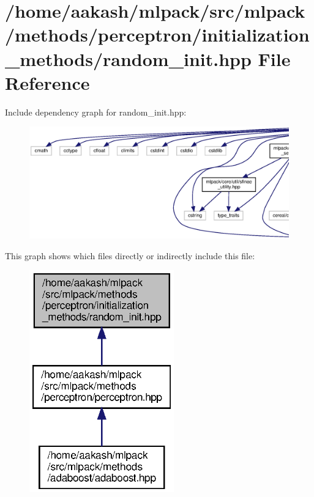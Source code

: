 \section{/home/aakash/mlpack/src/mlpack/methods/perceptron/initialization\+\_\+methods/random\+\_\+init.hpp File Reference}
\label{perceptron_2initialization__methods_2random__init_8hpp}
Include dependency graph for random\+\_\+init.\+hpp\+:
\nopagebreak
\begin{figure}[H]
\begin{center}
\leavevmode
\includegraphics[width=350pt]{perceptron_2initialization__methods_2random__init_8hpp__incl}
\end{center}
\end{figure}
This graph shows which files directly or indirectly include this file\+:
\nopagebreak
\begin{figure}[H]
\begin{center}
\leavevmode
\includegraphics[width=177pt]{perceptron_2initialization__methods_2random__init_8hpp__dep__incl}
\end{center}
\end{figure}
